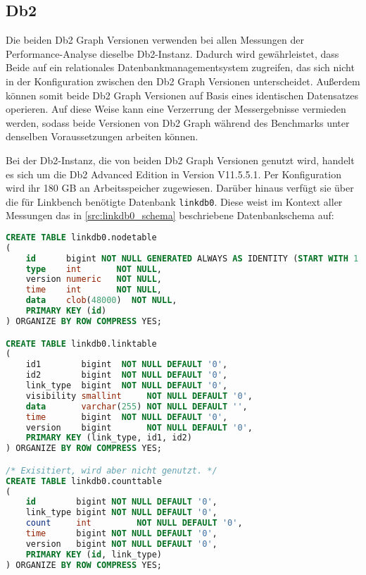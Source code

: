 \subsection{Db2}
Die beiden Db2 Graph Versionen verwenden bei allen Messungen der Performance-Analyse dieselbe Db2-Instanz. Dadurch wird gewährleistet, dass Beide auf ein relationales Datenbankmanagementsystem zugreifen, das sich nicht in der Konfiguration zwischen den Db2 Graph Versionen unterscheidet. Außerdem können somit beide Db2 Graph Versionen auf Basis eines identischen Datensatzes operieren. Auf diese Weise kann eine Verzerrung der Messergebnisse vermieden werden, sodass beide Versionen von Db2 Graph während des Benchmarks unter denselben Voraussetzungen arbeiten können.

Bei der Db2-Instanz, die von beiden Db2 Graph Versionen genutzt wird, handelt es sich um die Db2 Advanced Edition in Version V11.5.5.1. Per Konfiguration wird ihr 180 GB an Arbeitsspeicher zugewiesen. Darüber hinaus verfügt sie über die für Linkbench benötigte Datenbank \texttt{linkdb0}. Diese weist im Kontext aller Messungen das in \autoref{src:linkdb0_schema} beschriebene Datenbankschema auf:

\begin{lstlisting}[label=src:linkdb0_schema,caption={Db2-Instanz Datenbankschema für linkdb0},language=SQL]
CREATE TABLE linkdb0.nodetable
(
    id      bigint NOT NULL GENERATED ALWAYS AS IDENTITY (START WITH 1 INCREMENT BY 1),
    type    int       NOT NULL,
    version numeric   NOT NULL,
    time    int       NOT NULL,
    data    clob(48000)  NOT NULL,
    PRIMARY KEY (id)
) ORGANIZE BY ROW COMPRESS YES;

CREATE TABLE linkdb0.linktable
(
    id1        bigint  NOT NULL DEFAULT '0',
    id2        bigint  NOT NULL DEFAULT '0',
    link_type  bigint  NOT NULL DEFAULT '0',
    visibility smallint     NOT NULL DEFAULT '0',
    data       varchar(255) NOT NULL DEFAULT '',
    time       bigint  NOT NULL DEFAULT '0',
    version    bigint       NOT NULL DEFAULT '0',
    PRIMARY KEY (link_type, id1, id2)
) ORGANIZE BY ROW COMPRESS YES;

/* Exisitiert, wird aber nicht genutzt. */
CREATE TABLE linkdb0.counttable
(
    id        bigint NOT NULL DEFAULT '0',
    link_type bigint NOT NULL DEFAULT '0',
    count     int         NOT NULL DEFAULT '0',
    time      bigint NOT NULL DEFAULT '0',
    version   bigint NOT NULL DEFAULT '0',
    PRIMARY KEY (id, link_type)
) ORGANIZE BY ROW COMPRESS YES;
\end{lstlisting}

